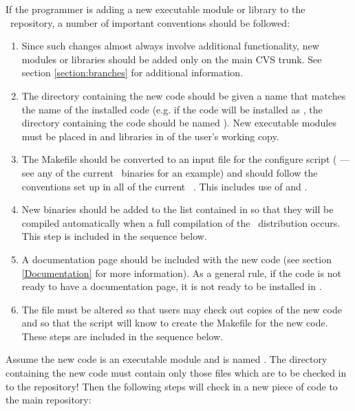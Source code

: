 If the programmer is adding a new executable module or library to the
\PSIthree\ repository, a number of important conventions should be followed:

\begin{enumerate}
\item Since such changes almost always involve additional functionality,
new modules or libraries should be added only on the main CVS trunk.
See section \ref{section:branches} for additional information.

\item The directory containing the new code should be given a name
  that matches the name of the installed code (e.g. if the code will
  be installed as , the directory containing the code
  should be named ). New executable modules must be
  placed in  and libraries in
   of the user's working copy.

\item The Makefile should be converted to an input file for the
  configure script ( --- see any of the current
  \PSIthree\ binaries for an example) and should follow the
  conventions set up in all of the current \PSIthree\
  . This includes use of  and
  .

\item New binaries should be added to the list contained in
   so that they will be
  compiled automatically when a full compilation of the \PSIthree\
  distribution occurs. This step is included in the sequence below.

\item A documentation page should be included with the new code (see
  section \ref{Documentation} for more information). As a general
  rule, if the code is not ready to have a documentation page, it is
  not ready to be installed in \PSIthree.

\item The  file must be altered so that users may
  check out copies of the new code and so that the 
  script will know to create the Makefile for the new code. These
  steps are included in the sequence below.

\end{enumerate}

Assume the new code is an executable module and is named
. The directory containing the new code must
contain only those files which are to be checked in to the repository!
Then the following steps will check in a new piece of code to the main
repository:

